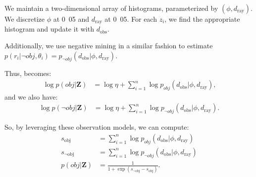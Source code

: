 We maintain a two-dimensional array of histograms, parameterized by $(\phi,
d_{\text{ray}})$. We discretize $\phi$ at \unit{0.05}{\rad} and
$d_{\text{ray}}$ at \unit{0.05}{\m}. For each $z_i$, we find the appropriate
histogram and update it with $d_{\text{obs}}$.

Additionally, we use negative mining in a similar fashion to estimate
$p( r_i | \lnot obj, \theta_i) = p_{\lnot obj} ( d_{\text{obs}} | \phi, d_{\text{ray}}) $.

Thus,  becomes:
%
\begin{align}
  \log p( obj | \mathbf{Z} ) &=
   \log{\eta} + \sum_{i=1}^{n} { \log p_{obj}( d_{\text{obs}} | \phi, d_{\text{ray}}) }
   \text{,}
   \label{eq:obj_model_pos}
\end{align}
%
and we also have:
%
\begin{align}
  \log p( \lnot obj | \mathbf{Z} ) &=
   \log{\eta} + \sum_{i=1}^{n} { \log p_{\lnot obj} ( d_{\text{obs}} | \phi, d_{\text{ray}}) }
   \text{.}
   \label{eq:obj_model_neg}
\end{align}

So, by leveraging these observation models, we can compute:
%
\begin{align}
  s_{ \text{obj} }     &=
    \sum_{i=1}^{n} { \log p_{obj}( d_{\text{obs}} | \phi, d_{\text{ray}}) } \\
  s_{\lnot \text{obj}} &=
    \sum_{i=1}^{n} { \log p_{\lnot obj} ( d_{\text{obs}} | \phi, d_{\text{ray}}) } \\
  p ( obj | \mathbf{Z} ) &=
    \frac{1}{1 + \exp{(s_{\lnot \text{obj}} - s_{\text{obj}})}}
  \text{.}
  \label{eq:detection_prob}
\end{align}

